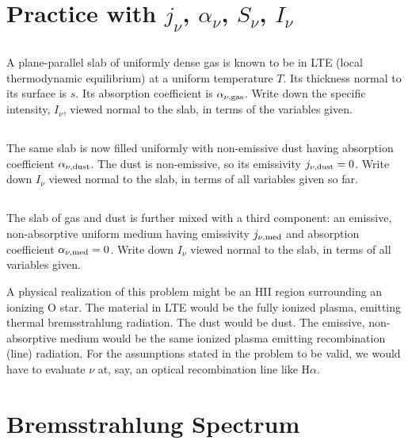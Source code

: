 \documentclass[11pt]{article}
\begin{document}
\section{Practice with $j_\nu$, $\alpha_\nu$, $S_\nu$, $I_\nu$}

\subsection{}

A plane-parallel slab of uniformly dense gas is known to be in LTE (local
thermodynamic equilibrium) at a uniform temperature $T$. Its thickness normal
to its surface is $s$. Its absorption coefficient is $\alpha_{\nu,{\rm gas}}$. 
Write down the
specific intensity, $I_\nu$, viewed normal to the slab, in terms of the variables
given.

\subsection{}

The same slab is now filled uniformly with non-emissive dust having absorption
coefficient $\alpha_{\nu,{\rm dust}}$. The dust is non-emissive, so its emissivity 
$j_{\nu,{\rm dust}}=0$.
Write down $I_\nu$ viewed normal to the slab, in terms of all variables given so
far.

\subsection{}

The slab of gas and dust is further mixed with a third component: an emissive,
non-absorptive uniform medium having emissivity $j_{\nu,{\rm med}}$ and
absorption coefficient $\alpha_{\nu,{\rm med}}=0$. Write down $I_\nu$ viewed
normal to the slab, in terms of all variables given.

A physical realization of this problem might be an HII region surrounding an
ionizing O star. The material in LTE would be the fully ionized plasma,
emitting thermal bremsstrahlung radiation. The dust would be dust. The
emissive, non-absorptive medium would be the same ionized plasma emitting
recombination (line) radiation. For the assumptions stated in the problem to be
valid, we would have to evaluate $\nu$ at, say, an optical recombination line
like H$\alpha$.

\section{Bremsstrahlung Spectrum}
\end{document}
